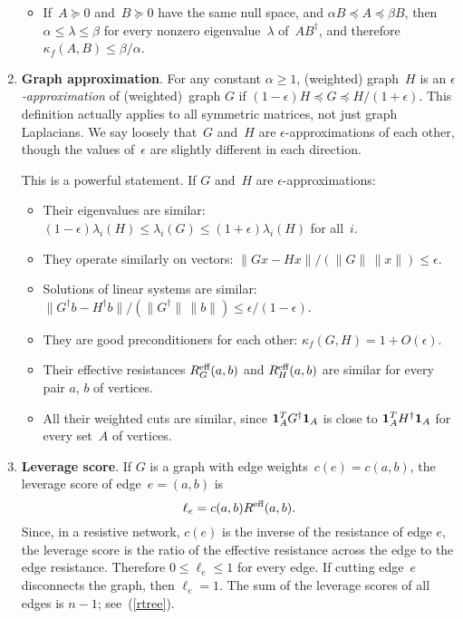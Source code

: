 \documentclass[11pt]{article}
\newcommand{\m}[1]{{\bf{#1}}}       %
\newcommand{\ones}{\m1}             %
\newcommand{\Reff}{R^{\mbox{\scriptsize eff}}}  %
\newcommand{\pinv}{^{\dagger}}          %
\begin{document}
\begin{enumerate}
\begin{itemize}
\item
If~$A\succeq 0$ and~$B\succeq 0$ have the same null space,
and $\alpha B \preceq A \preceq \beta B$,
then $\alpha \leq \lambda \leq \beta$
for every nonzero eigenvalue~$\lambda$ of~$AB\pinv$,
and therefore $\kappa_f(A,B) \leq \beta/\alpha$.

\end{itemize}

\item {\bf Graph approximation}.
For any constant $\alpha\geq 1$, 
(weighted) graph~$H$ is an {\em $\epsilon$-approximation} 
of (weighted)~graph $G$ if $(1-\epsilon) H \preceq G \preceq H/(1+\epsilon)$.
This definition actually applies to all symmetric matrices, 
not just graph Laplacians.
We say loosely that~$G$ and~$H$ are $\epsilon$-approximations of each other,
though the values of~$\epsilon$ are slightly different in each direction.

This is a powerful statement.
If $G$ and~$H$ are $\epsilon$-approximations: 

\begin{itemize}

\item Their eigenvalues are similar: 
$(1-\epsilon)\lambda_i(H)\leq\lambda_i(G)\leq(1+\epsilon)\lambda_i(H)$
for all~$i$.

\item They operate similarly on vectors:
$\|Gx-Hx\|/(\|G\|\,\|x\|) \leq \epsilon$.

\item Solutions of linear systems are similar:
$\|G\pinv b - H\pinv b\|/(\|G\pinv\|\,\|b\|) \leq \epsilon/(1-\epsilon)$.

\item They are good preconditioners for each other:
$\kappa_f(G,H) = 1 + O(\epsilon)$.

\item Their effective resistances $\Reff_G(a,b)$ and $\Reff_H(a,b)$
are similar for every pair $a$, $b$ of vertices.

\item All their weighted cuts are similar, 
since $\ones_A^TG\pinv\ones_A$ is close to $\ones_A^TH\pinv\ones_A$ 
for every set~$A$ of vertices.

\end{itemize}

\item{\bf Leverage score}.
If $G$ is a graph with edge weights~$c(e) = c(a,b)$, 
the leverage score of edge~$e = (a,b)$ is
$$\ell_e=c(a,b)\Reff(a,b).$$
Since, in a resistive network, 
$c(e)$ is the inverse of the resistance  of edge $e$,
the leverage score is the ratio of the effective resistance
across the edge to the edge resistance. 
Therefore $0\leq\ell_e\leq 1$ for every edge.
If cutting edge~$e$ disconnects the graph, then $\ell_e=1$.
The sum of the leverage scores of all edges is $n-1$;
see~(\ref{rtree}).


\end{enumerate}
\end{document}
